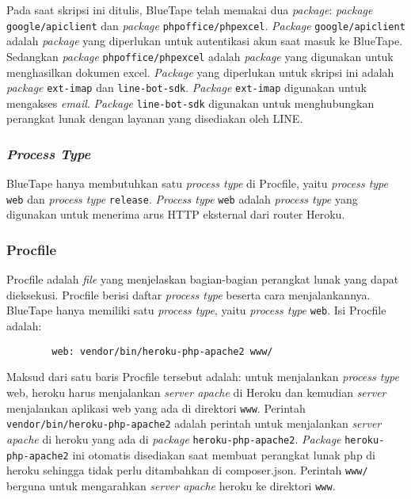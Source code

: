 		Pada saat skripsi ini ditulis, BlueTape telah memakai dua \textit{package}: \textit{package} \texttt{google/apiclient} dan \textit{package} \texttt{phpoffice/phpexcel}. \textit{Package} \texttt{google/apiclient} adalah \textit{package} yang diperlukan untuk autentikasi akun saat masuk ke BlueTape. Sedangkan \textit{package} \texttt{phpoffice/phpexcel} adalah \textit{package} yang digunakan untuk menghasilkan dokumen excel. \textit{Package} yang diperlukan untuk skripsi ini adalah \textit{package} \texttt{ext-imap} dan \texttt{line-bot-sdk}. \textit{Package} \texttt{ext-imap} digunakan untuk mengakses \textit{email}. \textit{Package} \texttt{line-bot-sdk} digunakan untuk menghubungkan perangkat lunak dengan layanan yang disediakan oleh LINE.
		
	\subsubsection{\textit{Process Type}}
		BlueTape hanya membutuhkan satu \textit{process type} di Procfile, yaitu \textit{process type} \texttt{web} dan \textit{process type} \texttt{release}. \textit{Process type} \texttt{web} adalah \textit{process type} yang digunakan untuk menerima arus HTTP eksternal dari router Heroku.
		
	\subsubsection{Procfile}
		Procfile adalah \textit{file} yang menjelaskan bagian-bagian perangkat lunak yang dapat dieksekusi. Procfile berisi daftar \textit{process type} beserta cara menjalankannya. BlueTape hanya memiliki satu \textit{process type}, yaitu \textit{process type} \texttt{web}. Isi Procfile adalah:
		\begin{lstlisting}
		web: vendor/bin/heroku-php-apache2 www/
		\end{lstlisting}
		
		Maksud dari satu baris Procfile tersebut adalah: untuk menjalankan \textit{process type} web, heroku harus menjalankan \textit{server apache} di Heroku dan kemudian \textit{server} menjalankan aplikasi web yang ada di direktori \texttt{www}. Perintah \texttt{vendor/bin/heroku-php-apache2} adalah perintah untuk menjalankan \textit{server apache} di heroku yang ada di \textit{package} \texttt{heroku-php-apache2}. \textit{Package} \texttt{heroku-php-apache2} ini otomatis disediakan saat membuat perangkat lunak php di heroku sehingga tidak perlu ditambahkan di composer.json. Perintah \texttt{www/} berguna untuk mengarahkan \textit{server apache} heroku ke direktori \texttt{www}.
		
